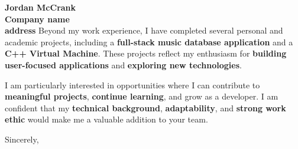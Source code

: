 \documentclass[11pt]{letter}
\newcommand{\hiringManager}{Jordan McCrank}
\newcommand{\companyName}{Company name}
\newcommand{\companyAddress}{address}
\begin{document}
\begin{letter}{\textbf{\hiringManager \\ \companyName \\ \companyAddress}}
\hspace*{1cm} Beyond my work experience, I have completed several personal and academic projects, including a \textbf{full-stack music database application} and a \textbf{C++ Virtual Machine}. These projects reflect my enthusiasm for \textbf{building user-focused applications} and \textbf{exploring new technologies}.

\hspace*{1cm} I am particularly interested in opportunities where I can contribute to \textbf{meaningful projects}, \textbf{continue learning}, and grow as a developer. I am confident that my \textbf{technical background}, \textbf{adaptability}, and \textbf{strong work ethic} would make me a valuable addition to your team.
\closing{Sincerely,}

\end{letter}
\end{document}

